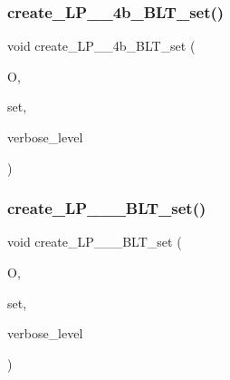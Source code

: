\subsubsection{\texorpdfstring{create\+\_\+\+L\+P\+\_\+\_\+4b\+\_\+\+B\+L\+T\+\_\+set()}{create\_LP\_37\_4b\_BLT\_set()}}
{\footnotesize\ttfamily void create\+\_\+\+L\+P\+\_\+\_\+4b\+\_\+\+B\+L\+T\+\_\+set (\begin{DoxyParamCaption}\item[{\mbox{\hyperlink{classorthogonal}{orthogonal}} $\ast$}]{O,  }\item[{\mbox{\hyperlink{galois_8h_a09fddde158a3a20bd2dcadb609de11dc}{I\+NT}} $\ast$}]{set,  }\item[{\mbox{\hyperlink{galois_8h_a09fddde158a3a20bd2dcadb609de11dc}{I\+NT}}}]{verbose\+\_\+level }\end{DoxyParamCaption})}

\mbox{\label{data_8_c_a3a0ca0fb9abb7febf8516028e65fa798}} 
\subsubsection{\texorpdfstring{create\+\_\+\+L\+P\+\_\+\_\+\_\+\+B\+L\+T\+\_\+set()}{create\_LP\_37\_72\_BLT\_set()}}
{\footnotesize\ttfamily void create\+\_\+\+L\+P\+\_\+\_\+\_\+\+B\+L\+T\+\_\+set (\begin{DoxyParamCaption}\item[{\mbox{\hyperlink{classorthogonal}{orthogonal}} $\ast$}]{O,  }\item[{\mbox{\hyperlink{galois_8h_a09fddde158a3a20bd2dcadb609de11dc}{I\+NT}} $\ast$}]{set,  }\item[{\mbox{\hyperlink{galois_8h_a09fddde158a3a20bd2dcadb609de11dc}{I\+NT}}}]{verbose\+\_\+level }\end{DoxyParamCaption})}

\mbox{\label{data_8_c_ab6f68b0ad3b8ccc37d88073576930ea8}} 
